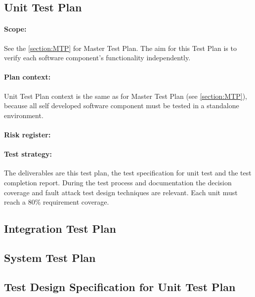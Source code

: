 \subsection{Unit Test Plan}
\paragraph{Scope:} See the \autoref{section:MTP} for Master Test Plan. The aim for this Test Plan is to verify each software component's functionality independently.
\paragraph{Plan context:} Unit Test Plan context is the same as for Master Test Plan (see \autoref{section:MTP}), because all self developed software component must be tested in a standalone environment. 
\paragraph{Risk register:}
\paragraph{Test strategy:} The deliverables are this test plan, the test specification for unit test and the test completion report. 
During the test process and documentation the decision coverage and fault attack test design techniques are relevant.
Each unit must reach a 80\%  requirement coverage. 


\subsection{Integration Test Plan}

\subsection{System Test Plan}







\subsection{Test Design Specification for Unit Test Plan}

